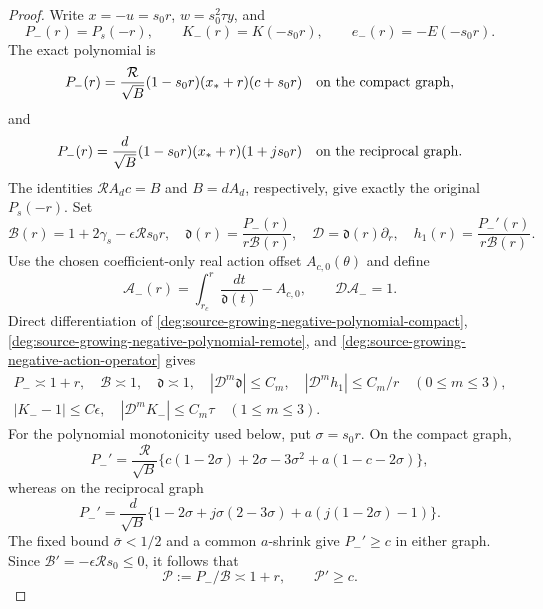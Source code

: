 \begin{proof}
Write \(x=-u=s_0r\), \(w=s_0^2\tau y\), and
\begin{equation}
 P_-(r)=P_s(-r),\qquad K_-(r)=K(-s_0r),\qquad
 e_-(r)=-E(-s_0r).
 \end{equation}
The exact polynomial is
\begin{equation}
 P_-(r)=\frac{\mathcal R}{\sqrt B}
       (1-s_0r)(x_*+r)(c+s_0r)
 \quad\hbox{on the compact graph},
 \label{deg:source-growing-negative-polynomial-compact}
\end{equation}
and
\begin{equation}
 P_-(r)=\frac d{\sqrt B}
       (1-s_0r)(x_*+r)(1+js_0r)
 \quad\hbox{on the reciprocal graph}.
 \label{deg:source-growing-negative-polynomial-remote}
\end{equation}
The identities $\mathcal RA_dc=B$ and $B=dA_d$, respectively,
give exactly the original $P_s(-r)$.
Set
\begin{equation}
 \mathscr B(r)=1+2\gamma_s-\epsilon\mathcal R s_0r,\quad
 \mathfrak d(r)=\frac{P_-(r)}{r\mathscr B(r)},\quad
 \mathcal D=\mathfrak d(r)\partial_r,\quad
 h_1(r)=\frac{P_-'(r)}{r\mathscr B(r)} .
 \label{deg:source-growing-negative-action-operator}
\end{equation}
Use the chosen coefficient-only real action offset \(A_{c,0}(\theta)\)
and define
\begin{equation}
 \mathcal A_-(r)=\int_{r_c}^r\frac{dt}{\mathfrak d(t)}
                       -A_{c,0},\qquad \mathcal D\mathcal A_-=1.
 \label{deg:source-growing-chosen-action-offset}
\end{equation}
Direct differentiation of \eqref{deg:source-growing-negative-polynomial-compact}, \eqref{deg:source-growing-negative-polynomial-remote}, and \eqref{deg:source-growing-negative-action-operator} gives
\begin{equation}
 \begin{gathered}
 P_-\asymp1+r,\quad \mathscr B\asymp1,\quad
 \mathfrak d\asymp1,\quad
 |\mathcal D^m\mathfrak d|\le C_m,\quad
 |\mathcal D^mh_1|\le C_m/r\quad(0\le m\le3),\\
 |K_--1|\le C\epsilon,\quad
 |\mathcal D^mK_-|\le C_m\tau\quad(1\le m\le3).
 \end{gathered}
 \label{deg:source-growing-negative-coefficient-bounds}
\end{equation}
For the polynomial monotonicity used below, put \(\sigma=s_0r\).
On the compact graph,
\[
 P_-'=\frac{\mathcal R}{\sqrt B}
 \{c(1-2\sigma)+2\sigma-3\sigma^2
                         +a(1-c-2\sigma)\},
\]
whereas on the reciprocal graph
\[
 P_-'=\frac d{\sqrt B}
 \{1-2\sigma+j\sigma(2-3\sigma)
                         +a(j(1-2\sigma)-1)\}.
\]
The fixed bound \(\bar\sigma<1/2\) and a common \(a\)-shrink
give \(P_-'\ge c\) in either graph.  Since
\(\mathscr B'=-\epsilon\mathcal R s_0\le0\), it follows that
\begin{equation}\label{deg:degree-negative-polynomial}
 \mathcal P:=P_-/\mathscr B\asymp1+r,\qquad
 \mathcal P'\ge c .
\end{equation}


\end{proof}
